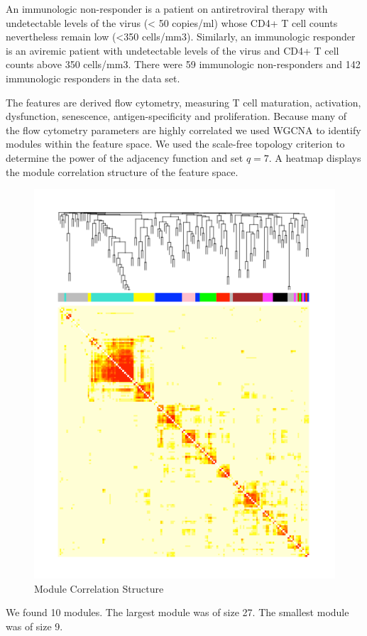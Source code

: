 \documentclass[article,shortnames]{jss}
\begin{document}
An immunologic non-responder is a patient on antiretroviral therapy with undetectable levels of the virus (< 50 copies/ml)
whose CD4+ T cell counts nevertheless remain low (<350 cells/mm3).  Similarly, an immunologic responder is an aviremic
patient with undetectable levels of the virus and CD4+ T cell counts above 350 cells/mm3.   There were 59 immunologic
non-responders and 142 immunologic responders in the data set.

The features are derived flow cytometry, measuring T cell maturation, activation, dysfunction, senescence, antigen-specificity
and proliferation.  Because many of the flow cytometry parameters are highly correlated we used WGCNA to identify
modules within the feature space.  We used the scale-free topology criterion to determine the power of the adjacency function
and set $q=7$.  A heatmap displays the module correlation structure of the feature space.
\begin{figure}[hc]
\caption{Module Correlation Structure}
\includegraphics{HeatMap.pdf}
\end{figure}
We found 10 modules.  The largest module was of size 27.  The smallest module was of size 9.
 
\end{document}
